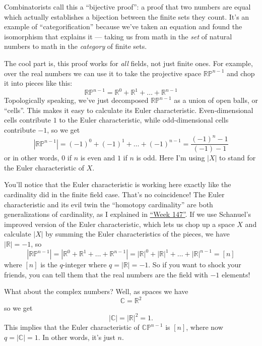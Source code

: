\documentclass{article}
\begin{document}
Combinatorists call this a ``bijective proof'': a proof that two numbers
are equal which actually establishes a bijection between the finite sets
they count. It's an example of ``categorification'' because we've taken
an equation and found the isomorphism that explains it --- taking us
from math in the \emph{set} of natural numbers to math in the
\emph{category} of finite sets.

The cool part is, this proof works for \emph{all} fields, not just
finite ones. For example, over the real numbers we can use it to take
the projective space \(\mathbb{RP}^{n-1}\) and chop it into pieces like
this:
\[\mathbb{RP}^{n-1} = \mathbb{R}^0 + \mathbb{R}^1 + \ldots + \mathbb{R}^{n-1}\]
Topologically speaking, we've just decomposed \(\mathbb{RP}^{n-1}\) as a
union of open balls, or ``cells''. This makes it easy to calculate its
Euler characteristic. Even-dimensional cells contribute \(1\) to the
Euler characteristic, while odd-dimensional cells contribute \(-1\), so
we get
\[|\mathbb{RP}^{n-1}| = (-1)^0 + (-1)^1 + \ldots + (-1)^{n-1} = \frac{(-1)^n-1}{(-1)-1}\]
or in other words, \(0\) if \(n\) is even and \(1\) if \(n\) is odd.
Here I'm using \(|X|\) to stand for the Euler characteristic of \(X\).

You'll notice that the Euler characteristic is working here exactly like
the cardinality did in the finite field case. That's no coincidence! The
Euler characteristic and its evil twin the ``homotopy cardinality'' are
both generalizations of cardinality, as I explained in
\protect\hyperlink{week147}{``Week 147''}. If we use Schanuel's improved
version of the Euler characteristic, which lets us chop up a space \(X\)
and calculate \(|X|\) by summing the Euler characteristics of the
pieces, we have \(|\mathbb{R}| = -1\), so
\[|\mathbb{RP}^{n-1}| = |\mathbb{R}^0+\mathbb{R}^1+\ldots+\mathbb{R}^{n-1}| = |\mathbb{R}|^0+|\mathbb{R}|^1+\ldots+|\mathbb{R}|^{n-1} = [n]\]
where \([n]\) is the \(q\)-integer where \(q = |\mathbb{R}| = -1\). So
if you want to shock your friends, you can tell them that the real
numbers are the field with \(-1\) elements!

What about the complex numbers? Well, as spaces we have
\[\mathbb{C} = \mathbb{R}^2\] so we get
\[|\mathbb{C}| = |\mathbb{R}|^2 = 1.\] This implies that the Euler
characteristic of \(\mathbb{CP}^{n-1}\) is \([n]\), where now
\(q = |\mathbb{C}| = 1\). In other words, it's just \(n\).
\end{document}
